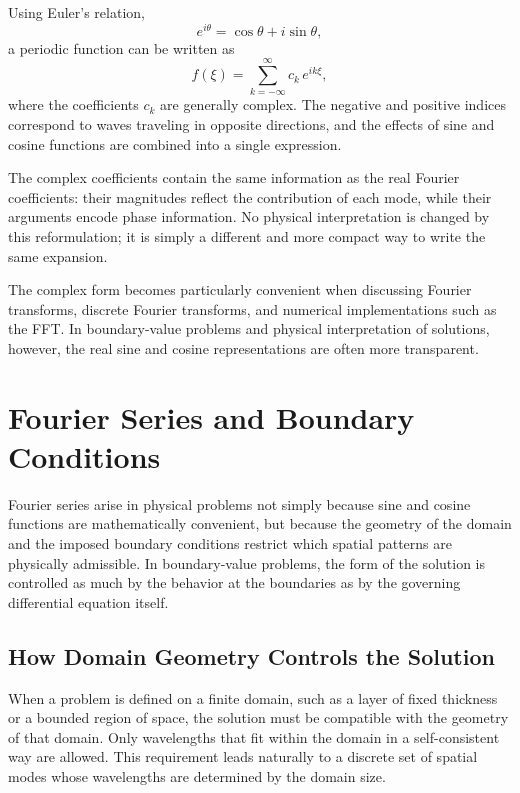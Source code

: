 Using Euler's relation,
\begin{equation}
    e^{i\theta} = \cos\theta + i\sin\theta,
\end{equation}
a periodic function can be written as
\begin{equation}
    f(\xi) = \sum_{k=-\infty}^{\infty} c_k\, e^{ik\xi},
\end{equation}
where the coefficients $c_k$ are generally complex. The negative and positive indices correspond to waves traveling in opposite directions, and the effects of sine and cosine functions are combined into a single expression.

The complex coefficients contain the same information as the real Fourier coefficients: their magnitudes reflect the contribution of each mode, while their arguments encode phase information. No physical interpretation is changed by this reformulation; it is simply a different and more compact way to write the same expansion.

The complex form becomes particularly convenient when discussing Fourier transforms, discrete Fourier transforms, and numerical implementations such as the FFT.  In boundary-value problems and physical interpretation of solutions, however, the real sine and cosine representations are often more transparent.

\section{Fourier Series and Boundary Conditions}

Fourier series arise in physical problems not simply because sine and cosine functions are mathematically convenient, but because the geometry of the domain and the imposed boundary conditions restrict which spatial patterns are physically admissible. In boundary-value problems, the form of the solution is controlled as much by the behavior at the boundaries as by the governing differential equation itself.

\subsection{How Domain Geometry Controls the Solution}

When a problem is defined on a finite domain, such as a layer of fixed thickness or a bounded region of space, the solution must be compatible with the geometry of that domain. Only wavelengths that fit within the domain in a self-consistent way are allowed. This requirement leads naturally to a discrete set of spatial modes whose wavelengths are determined by the domain size.

